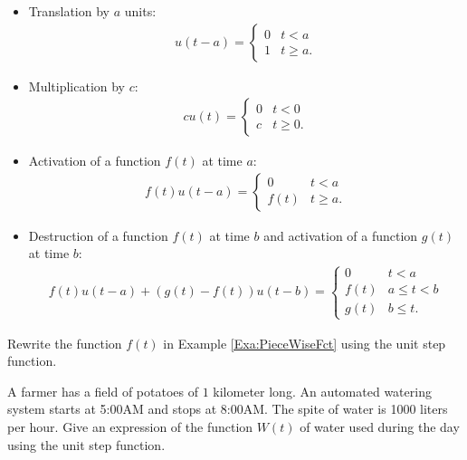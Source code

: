 \documentclass[12pt,a4paper]{article}
\newcounter{example}[section]
\begin{document}
	\begin{itemize}
	\item Translation by $a$ units:
		\begin{align*}
		u(t - a) = \left\{ 
			\begin{matrix}
			0 & t < a \\
			1 & t \geq a .
			\end{matrix} \right.
		\end{align*}
	\item Multiplication by $c$:
		\begin{align*}
		c u(t) = \left\{
			\begin{matrix}
			0 & t < 0 \\
			c & t \geq 0 .
			\end{matrix} \right.
		\end{align*}
	\item Activation of a function $f(t)$ at time $a$:
		\begin{align*}
		f(t) u (t - a) = \left\{
			\begin{matrix}
			0 & t < a \\
			f(t) & t \geq a .
			\end{matrix}
			\right.
		\end{align*}
	\item Destruction of a function $f(t)$ at time $b$ and activation of a function $g(t)$ at time $b$:
		\begin{align*}
		f(t) u(t - a) + (g(t) - f(t)) u(t - b) = \left\{
			\begin{matrix}
			0 & t < a \\
			f(t) & a \leq t < b \\
			g(t) & b \leq t .
			\end{matrix} \right.
		\end{align*}
	\end{itemize}
	
	\newpage
	
	\begin{example}
	Rewrite the function $f(t)$ in Example \ref{Exa:PieceWiseFct} using the unit step function.
	\end{example}
	
	
	\newpage
	
	\begin{example}
	A farmer has a field of potatoes of $1$ kilometer long. An automated watering system starts at 5:00\textsc{AM} and stops at 8:00\textsc{AM}. The spite of water is 1000 liters per hour. Give an expression of the function $W(t)$ of water used during the day using the unit step function.
	\end{example}
	
\end{document}
